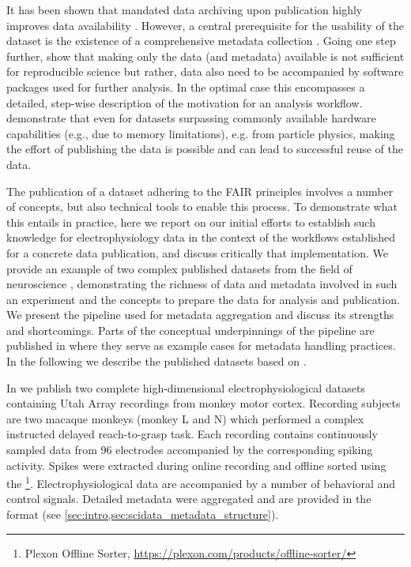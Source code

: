 It has been shown that mandated data archiving upon publication highly improves data availability \citep{Vines_2013}. However, a central prerequisite for the usability of the dataset is the existence of a comprehensive metadata collection \citep{Ferguson_2014,Parekh_2015,Ascoli_2017}. Going one step further, \citet{Chen_2019} show that making only the data (and metadata) available is not sufficient for reproducible science but rather, data also need to be accompanied by software packages used for further analysis. In the optimal case this encompasses a detailed, step-wise description of the motivation for an analysis workflow. \citet{Jomhari_2017} demonstrate that even for datasets surpassing commonly available hardware capabilities (e.g., due to memory limitations), e.g. from particle physics, making the effort of publishing the data is possible and can lead to successful reuse of the data.

The publication of a dataset adhering to the FAIR principles involves a number of concepts, but also technical tools to enable this process. To demonstrate what this entails in practice, here we report on our initial efforts to establish such knowledge for electrophysiology data in the context of the workflows established for a concrete data publication, and discuss critically that implementation. We provide an example of two complex published datasets from the field of neuroscience \citep{Brochier_2018}, demonstrating the richness of data and metadata involved in such an experiment and the concepts to prepare the data for analysis and publication. We present the pipeline used for metadata aggregation and discuss its strengths and shortcomings. Parts of the conceptual underpinnings of the pipeline are published in \citet{Zehl_2016} where they serve as example cases for metadata handling practices. In the following we describe the published datasets based on \citet{Brochier_2018}.



In \citet{Brochier_2018} we publish two complete high-dimensional electrophysiological datasets containing Utah Array recordings from monkey motor cortex. Recording subjects are two macaque monkeys (monkey L and N) which performed a complex instructed delayed reach-to-grasp task. Each recording contains continuously sampled data from 96 electrodes accompanied by the corresponding spiking activity. Spikes were extracted during online recording and offline sorted using the \footnote{Plexon Offline Sorter, \url{https://plexon.com/products/offline-sorter/}}. Electrophysiological data are accompanied by a number of behavioral and control signals. Detailed metadata were aggregated and are provided in the  format (see \cref{sec:intro,sec:scidata_metadata_structure}).

